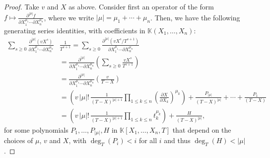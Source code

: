 \documentclass[final,1p,times,authoryear]{elsarticle}
\newcommand{\lf}{X}
\def\K{\mathbb{K}}
\def\K {\ensuremath{\mathbb{K}}}
\begin{document}
\begin{proof}
  Take $v$ and $\lf$ as above. Consider first an operator of the form $f
  \mapsto \frac{ \partial^{|\mu|} f} {\partial X_1^{\mu_1} \cdots
  \partial X_n^{\mu_n}}$, where we write
  $|\mu|=\mu_1+\cdots+\mu_n$. Then, we have the following generating
  series identities, with coefficients in $\K(X_1,\dots,X_n)$:
  \begin{align*}
    \sum_{s \ge 0} 
    \frac{ \partial^{|\mu|} ( v \lf^s )} {\partial X_1^{\mu_1} \cdots
    \partial X_n^{\mu_n}}
    &\frac{1}{T^{s+1}} 
    =  \sum_{s \ge 0} 
    \frac{ \partial^{|\mu|} (v \lf^s/T^{s+1})} {\partial X_1^{\mu_1} \cdots
    \partial X_n^{\mu_n}}\\
    &=  
    \frac{ \partial^{|\mu|} } {\partial X_1^{\mu_1} \cdots
    \partial X_n^{\mu_n}}
    \left (\sum_{s \ge 0} \frac{v \lf^s}{T^{s+1}}\right ) \\
    &= \frac{ \partial^{|\mu|} } {\partial X_1^{\mu_1} \cdots
    \partial X_n^{\mu_n}}
    \left (\frac v{T-\lf} \right ) \\
    &= \left (v\, |\mu|!\,    \frac {1}{(T-\lf)^{|\mu|+1}} \prod_{1 \le k \le n} 
      \left (\frac{ \partial \lf} {\partial X_k} \right)^{\mu_k}
    \right ) + \frac{P_{|\mu|}}{(T-\lf)^{|\mu|}} + \cdots + \frac{P_{1}}{(T-\lf)}\\
    &=\left ( v\, |\mu|!\,    \frac {1}{(T-\lf)^{|\mu|+1}} \prod_{1 \le k \le n} 
      t_k^{\mu_k}
    \right ) + \frac{H}{(T-\lf)^{|\mu|}},
  \end{align*}
  for some polynomials $P_1,\dots,P_{|\mu|},H$ in $\K[X_1,\dots,X_n,T]$ that
  depend on the choices of $\mu$, $v$ and $X$, with $\deg_T(P_i) < i$
  for all $i$ and thus $\deg_T(H) < |\mu|$.


\end{proof}
\end{document}
